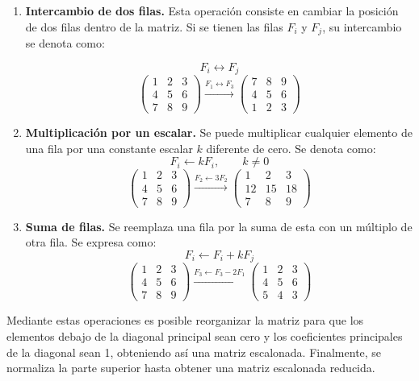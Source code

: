 \documentclass[12pt,a4paper]{article}
\begin{document}
\begin{enumerate}
    \item \textbf{Intercambio de dos filas.}  
    Esta operación consiste en cambiar la posición de dos filas dentro de la matriz. Si se tienen las filas $F_i$ y $F_j$, su intercambio se denota como:  
   
    \[
    F_i \leftrightarrow F_j
    \]
    \[
\begin{pmatrix}
1 & 2 & 3 \\
4 & 5 & 6 \\
7 & 8 & 9
\end{pmatrix}
\xrightarrow{F_1 \leftrightarrow F_3}
\begin{pmatrix}
7 & 8 & 9 \\
4 & 5 & 6 \\
1 & 2 & 3
\end{pmatrix}
\]

    \item \textbf{Multiplicación por un escalar.}  
    Se puede multiplicar cualquier elemento de una fila por una constante escalar $k$ diferente de cero. Se denota como:
    \[
    F_i \leftarrow k F_i, \qquad k \neq 0
    \]
\[
\begin{pmatrix}
1 & 2 & 3 \\
4 & 5 & 6 \\
7 & 8 & 9
\end{pmatrix}
\xrightarrow{F_2 \leftarrow 3F_2}
\begin{pmatrix}
1 & 2 & 3 \\
12 & 15 & 18 \\
7 & 8 & 9
\end{pmatrix}
\]

\item \textbf{Suma de filas.}  
    Se reemplaza una fila por la suma de esta con un múltiplo de otra fila. Se expresa como:
    \[
    F_i \leftarrow F_i + k F_j
    \]
\[
\begin{pmatrix}
1 & 2 & 3 \\
4 & 5 & 6 \\
7 & 8 & 9
\end{pmatrix}
\xrightarrow{F_3 \leftarrow F_3 - 2F_1}
\begin{pmatrix}
1 & 2 & 3 \\
4 & 5 & 6 \\
5 & 4 & 3
\end{pmatrix}
\]
\end{enumerate}


Mediante estas operaciones es posible reorganizar la matriz para que los elementos debajo de la diagonal principal sean cero y los coeficientes principales de la diagonal sean 1, obteniendo así una matriz escalonada. Finalmente, se normaliza la parte superior hasta obtener una matriz escalonada reducida.
\end{document}
